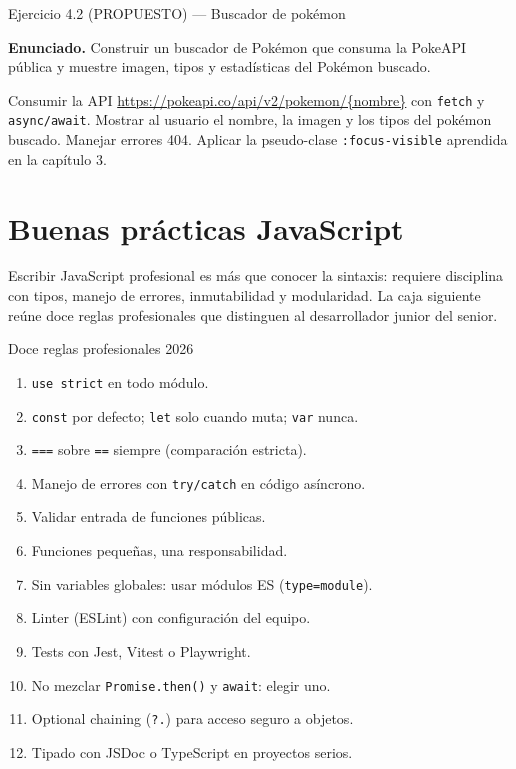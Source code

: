 \begin{cajaejercicio}{Ejercicio 4.2 (PROPUESTO) --- Buscador de pokémon}


\textbf{Enunciado.} Construir un buscador de Pokémon que consuma la PokeAPI pública y muestre imagen, tipos y estadísticas del Pokémon buscado.

Consumir la API \url{https://pokeapi.co/api/v2/pokemon/\{nombre\}} con
\texttt{fetch} y \texttt{async/await}. Mostrar al usuario el nombre,
la imagen y los tipos del pokémon buscado. Manejar errores 404.
Aplicar la pseudo-clase \texttt{:focus-visible} aprendida en la
capítulo 3.
\end{cajaejercicio}

\section{Buenas prácticas JavaScript}

Escribir JavaScript profesional es más que conocer la
sintaxis: requiere disciplina con tipos, manejo de errores,
inmutabilidad y modularidad. La caja siguiente reúne doce reglas
profesionales que distinguen al desarrollador junior del senior.


\begin{cajabuenas}{Doce reglas profesionales 2026}
\begin{enumerate}
\item \texttt{use strict} en todo módulo.
\item \texttt{const} por defecto; \texttt{let} solo cuando muta;
\texttt{var} nunca.
\item \texttt{===} sobre \texttt{==} siempre (comparación estricta).
\item Manejo de errores con \texttt{try/catch} en código asíncrono.
\item Validar entrada de funciones públicas.
\item Funciones pequeñas, una responsabilidad.
\item Sin variables globales: usar módulos ES (\texttt{type=module}).
\item Linter (ESLint) con configuración del equipo.
\item Tests con Jest, Vitest o Playwright.
\item No mezclar \texttt{Promise.then()} y \texttt{await}: elegir uno.
\item Optional chaining (\texttt{?.}) para acceso seguro a objetos.
\item Tipado con JSDoc o TypeScript en proyectos serios.
\end{enumerate}
\end{cajabuenas}

